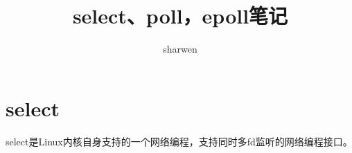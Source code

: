\documentclass[a4paper,fontset=mac]{ctexart}
\title{select、poll，epoll笔记}
\author{sharwen}
\date{}
\newcommand{\sanhao}{\fontsize{15.75pt}{\baselineskip}\selectfont}  %
\begin{document}
%	
%	
%	
%
	\maketitle
	\tableofcontents
%		
	\newpage%
	
	\section{select}
	select是Linux内核自身支持的一个网络编程，支持同时多fd监听的网络编程接口。
	
\end{document}
